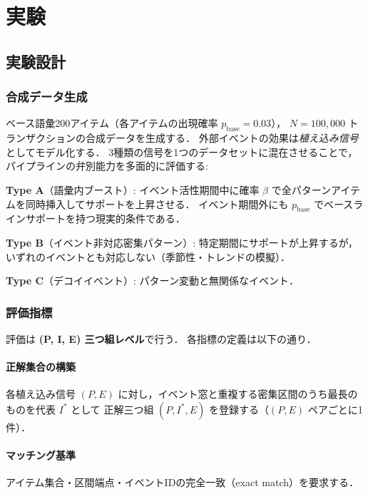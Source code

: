 \section{実験}\label{sec:experiments}

\subsection{実験設計}

\subsubsection{合成データ生成}

ベース語彙200アイテム（各アイテムの出現確率 $p_{\text{base}} = 0.03$），
$N = 100{,}000$ トランザクションの合成データを生成する．
外部イベントの効果は\emph{植え込み信号}としてモデル化する．
3種類の信号を1つのデータセットに混在させることで，
パイプラインの弁別能力を多面的に評価する:

\noindent\textbf{Type A}（語彙内ブースト）:
イベント活性期間中に確率 $\beta$ で全パターンアイテムを同時挿入してサポートを上昇させる．
イベント期間外にも $p_{\text{base}}$ でベースラインサポートを持つ現実的条件である．

\noindent\textbf{Type B}（イベント非対応密集パターン）:
特定期間にサポートが上昇するが，いずれのイベントとも対応しない（季節性・トレンドの模擬）．

\noindent\textbf{Type C}（デコイイベント）:
パターン変動と無関係なイベント．

\subsubsection{評価指標}\label{sec:eval_metrics}

評価は \textbf{(P, I, E) 三つ組レベル}で行う．
各指標の定義は以下の通り．

\paragraph{正解集合の構築}
各植え込み信号 $(P, E)$ に対し，イベント窓と重複する密集区間のうち最長のものを代表 $I^*$ として
正解三つ組 $(P, I^*, E)$ を登録する（$(P, E)$ ペアごとに1件）．

\paragraph{マッチング基準}
アイテム集合・区間端点・イベントIDの完全一致（exact match）を要求する．

